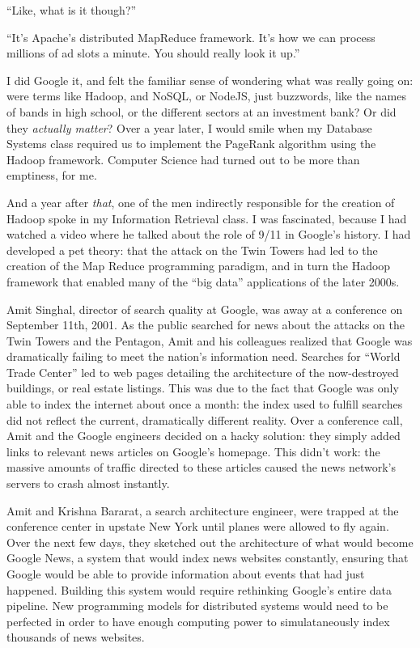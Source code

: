 \documentclass[12pt]{memoir}
\begin{document}
``Like, what is it though?''

``It's Apache's distributed MapReduce framework.  It's how we can process
millions of ad slots a minute.  You should really look it up.''

I did Google it, and felt the familiar sense of wondering what was really going
on: were terms like Hadoop, and NoSQL, or NodeJS, just buzzwords, like the names
of bands in high school, or the different sectors at an investment bank?  Or did
they \textit{actually matter}?  Over a year later, I would smile when my Database Systems class
required us to implement the PageRank algorithm using the Hadoop framework.
Computer Science had turned out to be more than emptiness, for me.

And a year after \textit{that}, one of the men indirectly responsible for the
creation of Hadoop spoke in my Information Retrieval class.  I was fascinated,
because I had watched a video where he talked about the role of 9/11 in Google's
history.  I had developed a pet theory: that the attack on the Twin Towers had
led to the creation of the Map Reduce programming paradigm, and in turn the
Hadoop framework that enabled many of the ``big data'' applications of the later
2000s.

Amit Singhal, director of search quality at Google, was away at a conference on
September 11th, 2001. As the public searched for news about the attacks on the
Twin Towers and the Pentagon, Amit and his colleagues realized that Google was
dramatically failing to meet the nation's information need. Searches for ``World
Trade Center'' led to web pages detailing the architecture of the now-destroyed
buildings, or real estate listings.  This was due to the fact that Google was
only able to index the internet about once a month: the index used to fulfill
searches did not reflect the current, dramatically different reality.  Over a
conference call, Amit and the Google engineers decided on a hacky solution: they
simply added links to relevant news articles on Google's homepage.  This didn't
work: the massive amounts of traffic directed to these articles caused the news
network's servers to crash almost instantly.

Amit and Krishna Bararat, a search architecture engineer, were trapped at the
conference center in upstate New York until planes were allowed to fly again.
Over the next few days, they sketched out the architecture of what would become
Google News, a system that would index news websites constantly, ensuring that
Google would be able to provide information about events that had just happened.
Building this system would require rethinking Google's entire data pipeline.
New programming models for distributed systems would need to be perfected in
order to have enough computing power to simulataneously index thousands of news
websites.
\end{document}
